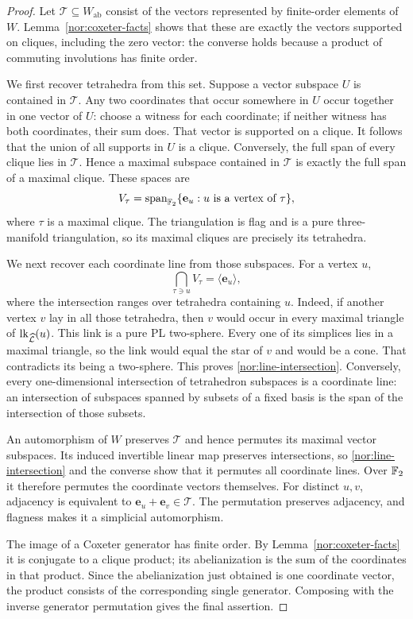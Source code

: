 \begin{proof}
Let $\mathcal T\subseteq W_{\mathrm{ab}}$ consist of the
vectors represented by finite-order elements of $W$.
Lemma~\ref{nor:coxeter-facts} shows that these are exactly the
vectors supported on cliques, including the zero vector: the
converse holds because a product of commuting involutions has
finite order.

We first recover tetrahedra from this set.  Suppose a vector
subspace $U$ is contained in $\mathcal T$.  Any two coordinates
that occur somewhere in $U$ occur together in one vector of
$U$: choose a witness for each coordinate; if neither witness
has both coordinates, their sum does.  That vector is
supported on a clique.  It follows that the union of all
supports in $U$ is a clique.  Conversely, the full span of
every clique lies in $\mathcal T$.  Hence a maximal subspace
contained in $\mathcal T$ is exactly the full span of a
maximal clique.  These spaces are
\[
 V_\tau=\operatorname{span}_{\mathbb F_2}
       \{\mathbf e_u:u\text{ is a vertex of }\tau\},
\]
where $\tau$ is a maximal clique.  The triangulation is flag
and is a pure three-manifold triangulation, so its maximal
cliques are precisely its tetrahedra.

We next recover each coordinate line from those subspaces.
For a vertex $u$,
\begin{equation}\label{nor:line-intersection}
 \bigcap_{\tau\ni u}V_\tau=\langle\mathbf e_u\rangle,
\end{equation}
where the intersection ranges over tetrahedra containing $u$.
Indeed, if another vertex $v$ lay in all those tetrahedra,
then $v$ would occur in every maximal triangle of
$\operatorname{lk}_{\widehat{\mathcal L}}(u)$.  This link is a pure PL
two-sphere.  Every one of its simplices lies in a maximal
triangle, so the link would equal the star of $v$ and would be
a cone.  That contradicts its being a two-sphere.  This proves
\eqref{nor:line-intersection}.  Conversely, every
one-dimensional intersection of tetrahedron subspaces is a
coordinate line: an intersection of subspaces spanned by
subsets of a fixed basis is the span of the intersection of
those subsets.

An automorphism of $W$ preserves $\mathcal T$ and hence
permutes its maximal vector subspaces.  Its induced invertible
linear map preserves intersections, so
\eqref{nor:line-intersection} and the converse show that it
permutes all coordinate lines.  Over $\mathbb F_2$ it therefore
permutes the coordinate vectors themselves.  For distinct
$u,v$, adjacency is equivalent to
$\mathbf e_u+\mathbf e_v\in\mathcal T$.  The permutation
preserves adjacency, and flagness makes it a simplicial
automorphism.

The image of a Coxeter generator has finite order.  By
Lemma~\ref{nor:coxeter-facts} it is conjugate to a clique
product; its abelianization is the sum of the coordinates in
that product.  Since the abelianization just obtained is one
coordinate vector, the product consists of the corresponding
single generator.  Composing with the inverse generator
permutation gives the final assertion.
\end{proof}

